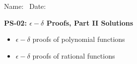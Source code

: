 \documentclass{article}
\begin{document}
\flushleft
Name:\ \makebox[3in]{\hrulefill} \hspace{1in} Date:\ \makebox[1in]{\hrulefill} 
\begin{center}
    \textbf{PS-02: $\epsilon-\delta$ Proofs, Part II \color{blue} Solutions \color{black}}

\end{center}

\begin{center}
\begin{tcolorbox}[colback=white, colframe=black, colbacktitle=white, coltitle=black, title=\textbf{Topics},boxrule=1pt,width=12cm]
    \begin{itemize}
        \item $\epsilon-\delta$ proofs of polynomial functions
        \item $\epsilon-\delta$ proofs of rational functions
    \end{itemize}
\end{tcolorbox}
\end{center}
\end{document}
